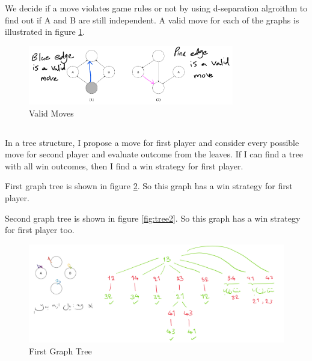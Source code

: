 \documentclass[en]{university}
\begin{document}
\setupdocument

\section{}

\subsection{}

We decide if a move violates game rules or not by using d-separation algroithm to find out 
if A and B are still independent. A valid move for each of the graphs is illustrated in 
figure \ref{fig:validmoves}.

\begin{figure}[!htbp]
    \centering
    \includegraphics[width=0.8\textwidth]{assets/1-a.png}
    \caption{Valid Moves}
    \label{fig:validmoves}
\end{figure}

\subsection{}

In a tree structure, I propose a move for first player and consider every possible move for second player and evaluate outcome 
from the leaves. If I can find a tree with all win outcomes, then I find a win strategy for first player. 

First graph tree is shown in figure \ref{fig:tree1}. So this graph has a win strategy for first player.

Second graph tree is shown in figure \ref{fig:tree2}. So this graph has a win strategy for first player too.

\begin{figure}[!htbp]
    \centering
    \includegraphics[width=\textwidth]{assets/1-b-1.png}
    \caption{First Graph Tree}
    \label{fig:tree1}
\end{figure}
\end{document}
